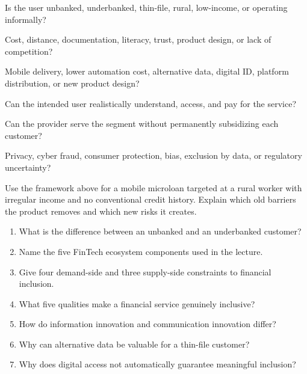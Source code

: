 \begin{utpsteps}
  \item {} Is the user unbanked, underbanked, thin-file, rural, low-income, or operating informally?
  \item {} Cost, distance, documentation, literacy, trust, product design, or lack of competition?
  \item {} Mobile delivery, lower automation cost, alternative data, digital ID, platform distribution, or new product design?
  \item {} Can the intended user realistically understand, access, and pay for the service?
  \item {} Can the provider serve the segment without permanently subsidizing each customer?
  \item {} Privacy, cyber fraud, consumer protection, bias, exclusion by data, or regulatory uncertainty?
\end{utpsteps}

\begin{tryit}
Use the framework above for a mobile microloan targeted at a rural worker with irregular income and no conventional credit history. Explain which old barriers the product removes and which new risks it creates.
\end{tryit}

\begin{quickcheck}
\begin{enumerate}
  \item What is the difference between an unbanked and an underbanked customer?
  \item Name the five FinTech ecosystem components used in the lecture.
  \item Give four demand-side and three supply-side constraints to financial inclusion.
  \item What five qualities make a financial service genuinely inclusive?
  \item How do information innovation and communication innovation differ?
  \item Why can alternative data be valuable for a thin-file customer?
  \item Why does digital access not automatically guarantee meaningful inclusion?
\end{enumerate}
\end{quickcheck}

